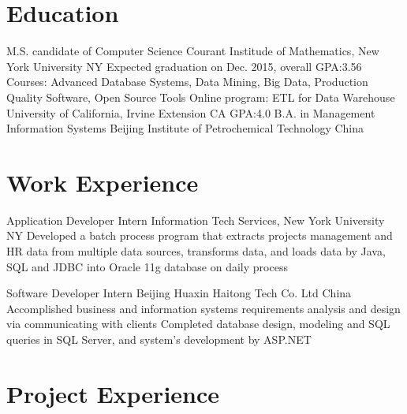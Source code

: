 \documentclass[11pt,a4paper,sans]{moderncv}   %
\begin{document}
\maketitle

\section{Education}
{M.S. candidate of Computer Science}
{Courant Institude of Mathematics, New York University}
{NY}
{Expected graduation on Dec. 2015, overall GPA:3.56}
{Courses: Advanced Database Systems, Data Mining, Big Data, Production Quality Software, Open Source Tools}
{Online program: ETL for Data Warehouse}
{University of California, Irvine Extension}
{CA}
{GPA:4.0}
{}
{B.A. in Management Information Systems}
{Beijing Institute of Petrochemical Technology}
{China}
{}{}


\section{Work Experience}
\renewcommand{\baselinestretch}{1.0}

{Application Developer Intern}
{}
{Information Tech Services, New York University}
{NY}
{{Developed a batch process program that extracts projects management and HR data from multiple data sources, transforms data, and loads data by Java, SQL and JDBC into Oracle 11g database on daily process}
}


{Software Developer Intern}
{}
{Beijing Huaxin Haitong Tech Co. Ltd}
{China}
{{Accomplished business and information systems requirements analysis and design via communicating with clients}
\newline
{Completed database design, modeling and SQL queries in SQL Server, and system’s development by ASP.NET}}



\section{Project Experience}
\renewcommand{\baselinestretch}{1.0}
\end{document}
